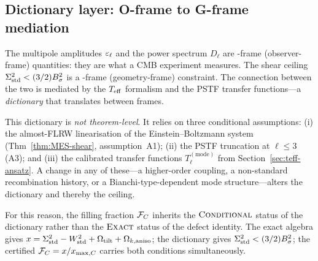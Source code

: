 \subsection{Dictionary layer: O-frame to G-frame mediation}
\label{sec:dictionary-layer}

The multipole amplitudes $\varepsilon_\ell$ and the power spectrum
$D_\ell$ are \Oframe-frame (observer-frame) quantities: they
are what a CMB experiment measures.  The shear ceiling
$\Sigma^2_{\mathrm{std}} < (3/2)B_\sigma^2$ is a \Gframe-frame (geometry-frame)
constraint.  The connection between the two is mediated by
the $T_{\mathrm{eff}}$ formalism and the PSTF transfer functions---a
\emph{dictionary} that translates between frames.

This dictionary is \emph{not theorem-level}.  It relies on three
conditional assumptions:
(i) the almost-FLRW linearisation of the Einstein--Boltzmann
system (Thm~\ref{thm:MES-shear}, assumption~A1);
(ii) the PSTF truncation at $\ell \leq 3$ (A3);
and (iii) the calibrated transfer functions $T_\ell^{(\text{mode})}$
from Section~\ref{sec:teff-ansatz}.  A change in any of
these---a higher-order coupling, a non-standard recombination
history, or a Bianchi-type-dependent mode structure---alters
the dictionary and thereby the ceiling.

For this reason, the filling fraction $\mathcal{F}_C$ inherits the
$\textsc{Conditional}$ status of the dictionary rather than the
$\textsc{Exact}$ status of the defect identity.  The exact
algebra gives $x = \Sigma^2_{\mathrm{std}} - W^2_{\mathrm{std}} + \Omega_{\mathrm{tilt}} + \Omega_{k,\mathrm{aniso}}$; the
dictionary gives $\Sigma^2_{\mathrm{std}} < (3/2)B_\sigma^2$; the certified
$\mathcal{F}_C = x/x_{\max,C}$ carries both conditions simultaneously.

\begin{center}
\end{center}


